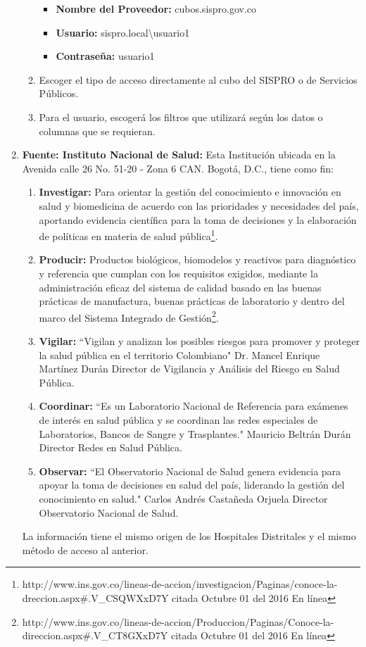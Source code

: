 \documentclass[a4paper,openright,12pt]{book}
\theoremstyle{definition}
\theoremstyle{remark}
\begin{document}
\begin{enumerate}
\begin{enumerate}
            \begin{itemize}
				\item \textbf{Nombre del Proveedor:} cubos.sispro.gov.co
       			 \item \textbf{Usuario:} sispro.local\textbackslash usuario1
				\item \textbf{Contraseña:} usuario1
	\end{itemize}
    	\item Escoger el tipo de acceso directamente al cubo del SISPRO o de Servicios Públicos.
        \item Para el usuario, escogerá los filtros que utilizará según los datos o columnas que se requieran.
	\end{enumerate}
    
    \item \textbf{Fuente: Instituto Nacional de Salud:} Esta Institución ubicada en la Avenida calle 26 No. 51-20 - Zona 6 CAN. Bogotá, D.C., tiene como fin:
    \begin{enumerate}
		\item \textbf{Investigar:} Para orientar la gestión del conocimiento e innovación en salud y biomedicina de acuerdo con las prioridades y necesidades del país, aportando evidencia científica para la toma de decisiones y la elaboración de políticas en materia de salud pública\footnote{http://www.ins.gov.co/lineas-de-accion/investigacion/Paginas/conoce-la-dreccion.aspx\#.V\_CSQWXxD7Y citada Octubre 01 del 2016 En línea}.  
        \item \textbf{Producir:}  Productos biológicos, biomodelos y reactivos para diagnóstico y referencia que cumplan con los requisitos exigidos, mediante la administración eficaz del sistema de calidad basado en las buenas prácticas de manufactura, buenas prácticas de laboratorio y dentro del marco del Sistema Integrado de Gestión\footnote{http://www.ins.gov.co/lineas-de-accion/Produccion/Paginas/Conoce-la-direccion.aspx\#.V\_CT8GXxD7Y citada Octubre 01 del 2016 En línea}.
        \item \textbf{Vigilar: }  “Vigilan y analizan los posibles riesgos para promover y proteger la salud pública en el territorio Colombiano"   Dr. Mancel Enrique Martínez Durán
Director de Vigilancia y Análisis del Riesgo en Salud Pública.
		\item \textbf{Coordinar:}  “Es un Laboratorio Nacional de Referencia para exámenes de interés en salud pública y se coordinan las redes especiales de Laboratorios, Bancos de Sangre y Trasplantes." Mauricio Beltrán Durán Director Redes en Salud Pública.
        \item \textbf{Observar:}  “El Observatorio Nacional de Salud genera evidencia para apoyar la toma de decisiones en salud del país, liderando la gestión del conocimiento en salud." Carlos Andrés Castañeda Orjuela Director Observatorio Nacional de Salud.
	\end{enumerate}
    La información tiene el mismo origen de los Hospitales Distritales y el mismo método de acceso al anterior.
\end{enumerate}
        
\end{document}
